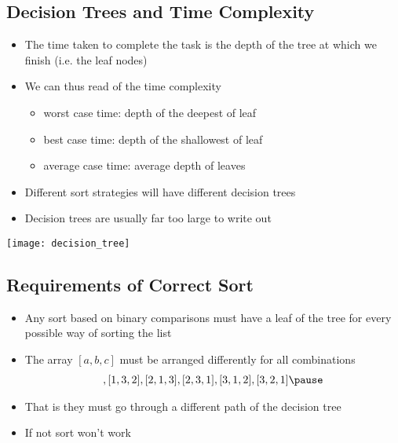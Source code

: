 \begin{slide}
\section[-2]{Decision Trees and Time Complexity}

\begin{PauseHighLight}
  \begin{itemize}
  \item The time taken to complete the task is the depth of the tree at
    which we finish (i.e. the leaf nodes)\pause
  \item We can thus read of the time complexity
    \begin{itemize}\squeeze
    \item worst case time: depth of the deepest of leaf\pause
    \item best case time: depth of the shallowest of leaf\pause
    \item average case time: average depth of leaves\pause
    \end{itemize}
  \item Different sort strategies will have different decision trees\pause
  \item Decision trees are usually far too large to write out \Frowny
  \end{itemize}
  \begin{center}
    \texttt{[image: decision\_tree]}\pause
  \end{center}
\end{PauseHighLight}

\end{slide}


\begin{slide}
\section[-2]{Requirements of Correct Sort}

\begin{PauseHighLight}
  \begin{itemize}
  \item Any sort based on binary comparisons must have a leaf of the
    tree for every possible way of sorting the list\pause
  \item The array $[a,b,c]$ must be arranged differently for all combinations
    \begin{align*}
      [1,2,3], [1,3,2], [2,1,3], [2,3,1], [3,1,2], [3,2,1]\pause
    \end{align*}
  \item That is they must go through a different path of the decision
    tree\pause
  \item If not sort won't work\pause
  \end{itemize}
\end{PauseHighLight}

\end{slide}

